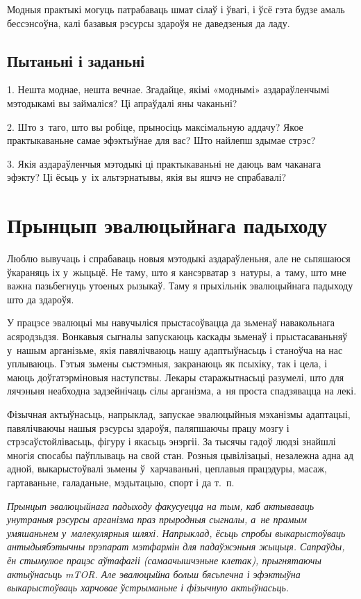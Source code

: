 Модныя практыкі могуць патрабаваць шмат сілаў і ўвагі, і ўсё гэта будзе амаль бессэнсоўна, калі базавыя рэсурсы здароўя не даведзеныя да ладу.

\subsection*{Пытаньні і заданьні}

1. Нешта моднае, нешта вечнае. Згадайце, якімі «моднымі» аздараўленчымі мэтодыкамі вы займаліся? Ці апраўдалі яны чаканьні?

2. Што з~таго, што вы робіце, прыносіць максімальную аддачу? Якое практыкаваньне самае эфэктыўнае для вас? Што найлепш здымае стрэс?

3. Якія аздараўленчыя мэтодыкі ці практыкаваньні не даюць вам чаканага эфэкту? Ці ёсьць у~іх альтэрнатывы, якія вы яшчэ не спрабавалі?


\section{Прынцып эвалюцыйнага падыходу}

Люблю вывучаць і спрабаваць новыя мэтодыкі аздараўленьня, але не сьпяшаюся ўкараняць іх у~жыцьцё. Не таму, што я кансэрватар з~натуры, а~таму, што мне важна пазьбегнуць утоеных рызыкаў. Таму я прыхільнік эвалюцыйнага падыходу што да здароўя.

У працэсе эвалюцыі мы навучыліся прыстасоўвацца да зьменаў навакольнага асяродзьдзя. Вонкавыя сыгналы запускаюць каскады зьменаў і прыстасаваньняў у~нашым арганізьме, якія павялічваюць нашу адаптыўнасьць і станоўча на нас уплываюць. Гэтыя зьмены сыстэмныя, закранаюць як псыхіку, так і цела, і маюць доўгатэрміновыя наступствы. Лекары старажытнасьці разумелі, што для лячэньня неабходна задзейнічаць сілы арганізма, а~ня проста спадзявацца на лекі. 


Фізычная актыўнасьць, напрыклад, запускае эвалюцыйныя мэханізмы адаптацыі, павялічваючы нашыя рэсурсы здароўя, паляпшаючы працу мозгу і стрэсаўстойлівасьць, фігуру і якасьць энэргіі. За тысячы гадоў людзі знайшлі многія спосабы паўплываць на свой стан. Розныя цывілізацыі, незалежна адна ад адной, выкарыстоўвалі зьмены ў~харчаваньні, цеплавыя працэдуры, масаж, гартаваньне, галаданьне, мэдытацыю, спорт і да т.~п.

\emph{Прынцып эвалюцыйнага падыходу факусуецца на тым, каб актываваць унутраныя рэсурсы арганізма праз прыродныя сыгналы, а~не прамым умяшаньнем у~малекулярныя шляхі. Напрыклад, ёсьць спробы выкарыстоўваць антыдыябэтычны прэпарат мэтфармін для падаўжэньня жыцьця. Сапраўды, ён стымулюе працэс аўтафагіі (самаачышчэньне клетак), прыгнятаючы актыўнасьць mTOR. Але эвалюцыйна больш бясьпечна і эфэктыўна выкарыстоўваць харчовае ўстрыманьне і фізычную актыўнасьць.}

